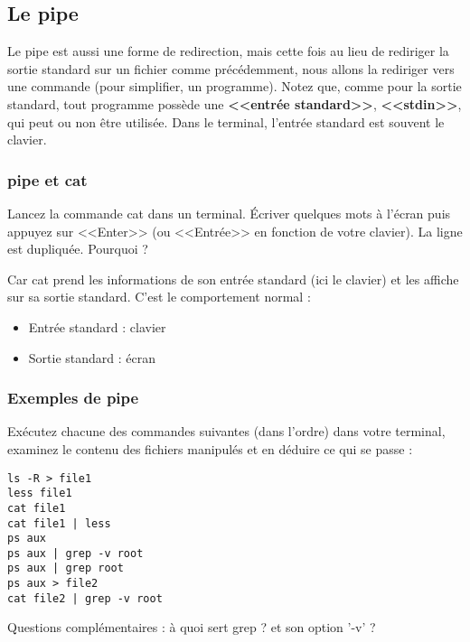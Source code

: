 \documentclass[11pt]{article}
\begin{document}
\subsection{Le pipe}

Le pipe est aussi une forme de redirection, mais cette fois au lieu de rediriger la sortie standard
sur un fichier comme précédemment, nous allons la rediriger vers une commande (pour simplifier, un
programme). Notez que, comme pour la sortie standard, tout programme possède une \textbf{<<entrée standard>>}, \textbf{<<stdin>>},
qui peut ou non être utilisée. Dans le terminal, l'entrée standard est souvent le clavier.

\subsubsection{pipe et cat}

Lancez la commande cat dans un terminal.
Écriver quelques mots à l’écran puis appuyez sur <<Enter>> (ou <<Entrée>> en fonction de votre clavier).
La ligne est dupliquée. Pourquoi ?

\begin{solution}
 Car cat prend les informations de son entrée standard (ici le clavier) et les affiche sur sa sortie standard.
 C’est le comportement normal :
 \begin{itemize}
  \item Entrée standard : clavier
  \item Sortie standard : écran
 \end{itemize}
\end{solution}

\subsubsection{Exemples de pipe}

Exécutez chacune des commandes suivantes (dans l’ordre) dans votre terminal, examinez le contenu des fichiers manipulés et en déduire ce qui se passe :

\begin{lstlisting}
ls -R > file1
less file1
cat file1
cat file1 | less
ps aux
ps aux | grep -v root
ps aux | grep root
ps aux > file2
cat file2 | grep -v root
\end{lstlisting}

Questions complémentaires : à quoi sert grep ? et son option '-v' ?
\end{document}
